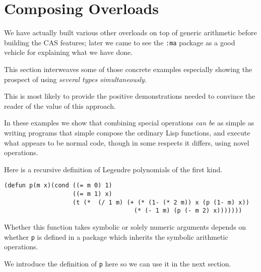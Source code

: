 \documentclass{article}
\begin{document}
{{\section{Composing Overloads}

We have actually built various other overloads on top of generic
arithmetic before building the CAS features; later we came to see the
{\tt :ma} package as a good vehicle for explaining what we have done.

This section interweaves some of those concrete examples
especially showing the prospect of using {\em several types simultaneously}.

This is most likely to provide the positive demonstrations
needed to convince the reader of the value of this approach.

In these examples we show that combining special
operations {\em can be} as simple as writing programs that
simple compose the ordinary Lisp functions, and execute what appears
to be normal code, though in some respects it differs, using novel
operations.

Here is a recursive definition of Legendre polynomials of the first kind.
\begin{verbatim}
(defun p(m x)(cond ((= m 0) 1)
                   ((= m 1) x)
                   (t (*  (/ 1 m) (+ (* (1- (* 2 m)) x (p (1- m) x))
                                    (* (- 1 m) (p (- m 2) x)))))))
\end{verbatim}
Whether this function takes symbolic or solely numeric arguments depends
on whether {\tt p} is defined in a package which inherits the symbolic
arithmetic operations.

We introduce the definition of {\tt p} here so we can use it in the next
section.

}}
\end{document}
